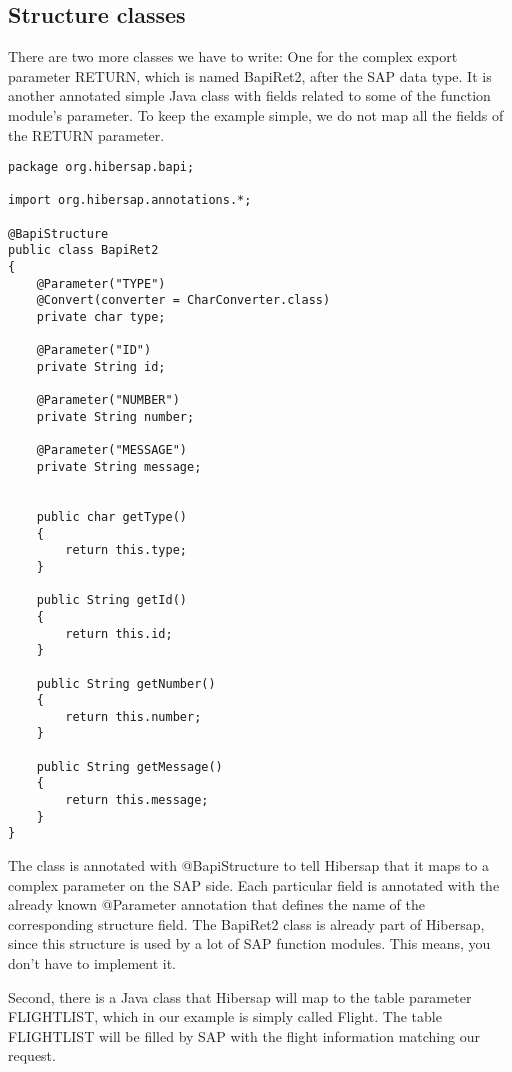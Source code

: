 \HRule


\subsection{Structure classes}

There are two more classes we have to write:
One for the complex export parameter RETURN, which is named BapiRet2, after the SAP data type.
It is another annotated simple Java class with fields related to some of the function module's parameter.
To keep the example simple, we do not map all the fields of the RETURN parameter.

\begin{Verbatim}[frame=single,label=The BapiRet2 class]
package org.hibersap.bapi;

import org.hibersap.annotations.*;

@BapiStructure
public class BapiRet2
{
    @Parameter("TYPE")
    @Convert(converter = CharConverter.class)
    private char type;

    @Parameter("ID")
    private String id;

    @Parameter("NUMBER")
    private String number;

    @Parameter("MESSAGE")
    private String message;


    public char getType()
    {
        return this.type;
    }

    public String getId()
    {
        return this.id;
    }

    public String getNumber()
    {
        return this.number;
    }

    public String getMessage()
    {
        return this.message;
    }
}
\end{Verbatim}

The class is annotated with @BapiStructure to tell Hibersap that it maps to
a complex parameter on the SAP side. Each particular field is annotated with the
already known @Parameter annotation that defines the name of the corresponding structure field.
The BapiRet2 class is already part of Hibersap, since this structure is used by a lot of
SAP function modules. This means, you don't have to implement it.

Second, there is a Java class that Hibersap will map to the table parameter FLIGHTLIST,
which in our example is simply called Flight.
The table FLIGHTLIST will be filled by SAP with the flight information matching our request.

